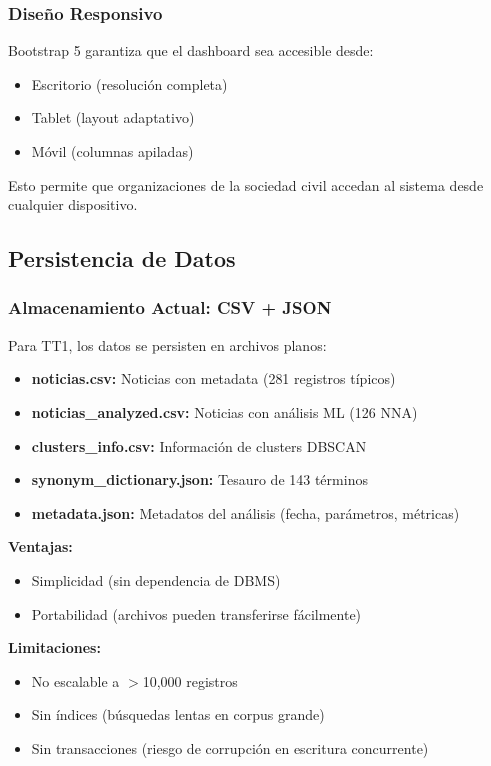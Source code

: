 \subsubsection{Diseño Responsivo}
\label{subsubsec:diseno_responsivo}

Bootstrap 5 garantiza que el dashboard sea accesible desde:
\begin{itemize}
    \item Escritorio (resolución completa)
    \item Tablet (layout adaptativo)
    \item Móvil (columnas apiladas)
\end{itemize}

Esto permite que organizaciones de la sociedad civil accedan al sistema desde cualquier dispositivo.

\subsection{Persistencia de Datos}
\label{subsec:persistencia}

\subsubsection{Almacenamiento Actual: CSV + JSON}
\label{subsubsec:csv_json}

Para TT1, los datos se persisten en archivos planos:

\begin{itemize}
    \item \textbf{noticias.csv:} Noticias con metadata (281 registros típicos)
    \item \textbf{noticias\_analyzed.csv:} Noticias con análisis ML (126 NNA)
    \item \textbf{clusters\_info.csv:} Información de clusters DBSCAN
    \item \textbf{synonym\_dictionary.json:} Tesauro de 143 términos
    \item \textbf{metadata.json:} Metadatos del análisis (fecha, parámetros, métricas)
\end{itemize}

\textbf{Ventajas:}
\begin{itemize}
    \item Simplicidad (sin dependencia de DBMS)
    \item Portabilidad (archivos pueden transferirse fácilmente)
\end{itemize}

\textbf{Limitaciones:}
\begin{itemize}
    \item No escalable a $>$10,000 registros
    \item Sin índices (búsquedas lentas en corpus grande)
    \item Sin transacciones (riesgo de corrupción en escritura concurrente)
\end{itemize}

